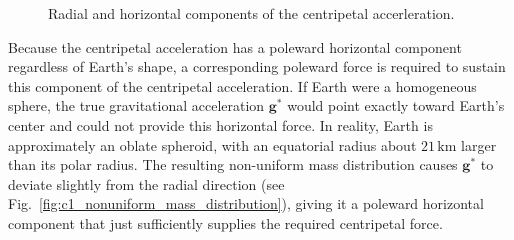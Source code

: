 \documentclass[10pt,twocolumn]{memoir}
\begin{document}
\begin{figure}[t]
\centering
{}

\caption{Radial and horizontal components of the centripetal accerleration.}
\label{fig:c1_radial_horizontal}
\end{figure}

Because the centripetal acceleration has a poleward horizontal component regardless of Earth's shape, a corresponding poleward force is required to sustain this component of the centripetal acceleration. If Earth were a homogeneous sphere, the true gravitational acceleration $\mathbf{g}^*$ would point exactly toward Earth's center and could not provide this horizontal force. In reality, Earth is approximately an oblate spheroid, with an equatorial radius about $21\,\mathrm{km}$ larger than its polar radius. The resulting non-uniform mass distribution causes $\mathbf{g}^*$ to deviate slightly from the radial direction (see Fig.~\ref{fig:c1_nonuniform_mass_distribution}), giving it a poleward horizontal component that just sufficiently supplies the required centripetal force.
\end{document}
